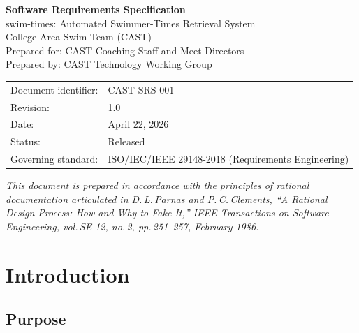 \documentclass[12pt]{article}
\begin{document}
\begin{titlepage}
  \centering
  \vspace*{2cm}
  {\Huge\bfseries\color{castblue} Software Requirements Specification\\[0.5em]}
  {\Large swim-times: Automated Swimmer-Times Retrieval System}\\[2em]
  {\large College Area Swim Team (CAST)}\\[0.5em]
  {\normalsize Prepared for: CAST Coaching Staff and Meet Directors}\\[0.5em]
  {\normalsize Prepared by: CAST Technology Working Group}\\[2em]
  \begin{tabular}{ll}
    Document identifier: & CAST-SRS-001                                     \\
    Revision:            & 1.0                                              \\
    Date:                & April 22, 2026                                   \\
    Status:              & Released                                         \\
    Governing standard:  & ISO/IEC/IEEE 29148-2018 (Requirements Engineering) \\
  \end{tabular}
  \vfill
  {\small\textit{This document is prepared in accordance with the principles
  of rational documentation articulated in D.\,L.\,Parnas and P.\,C.\,Clements,
  ``A Rational Design Process: How and Why to Fake It,''
  \textit{IEEE Transactions on Software Engineering}, vol.\,SE-12, no.\,2,
  pp.\,251--257, February 1986.}}
\end{titlepage}

\tableofcontents
\clearpage

\section{Introduction}

\subsection{Purpose}
\end{document}
